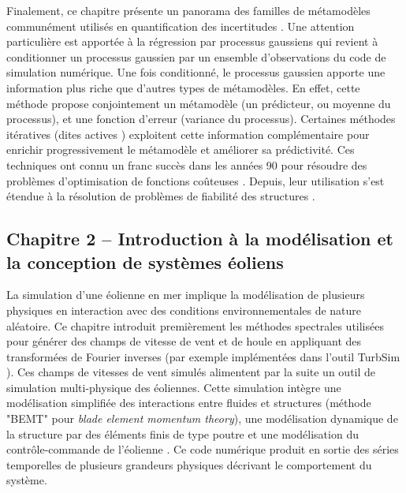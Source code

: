 Finalement, ce chapitre pr\'{e}sente un panorama des familles de m\'{e}tamodèles commun\'{e}ment utilis\'{e}s en quantification des incertitudes \citep{forrester_2008}. 
Une attention particulière est apport\'{e}e à la r\'{e}gression par processus gaussiens qui revient à conditionner un processus gaussien par un ensemble d'observations du code de simulation num\'{e}rique. 
Une fois conditionn\'{e}, le processus gaussien apporte une information plus riche que d'autres types de m\'{e}tamodèles. 
En effet, cette m\'{e}thode propose conjointement un m\'{e}tamodèle (un pr\'{e}dicteur, ou moyenne du processus), et une fonction d'erreur (variance du processus). 
Certaines m\'{e}thodes it\'{e}ratives (dites \og actives \fg{}) exploitent cette information compl\'{e}mentaire pour enrichir progressivement le m\'{e}tamodèle et am\'{e}liorer sa pr\'{e}dictivit\'{e}. 
Ces techniques ont connu un franc succès dans les ann\'{e}es 90 pour r\'{e}soudre des problèmes d'optimisation de fonctions coûteuses \citep{jones_1998}. 
Depuis, leur utilisation s'est \'{e}tendue à la r\'{e}solution de problèmes de fiabilit\'{e} des structures \citep{echard_2011}.

\subsection*{Chapitre 2 -- Introduction à la mod\'{e}lisation et la conception de systèmes \'{e}oliens}

La simulation d'une \'{e}olienne en mer implique la mod\'{e}lisation de plusieurs physiques en interaction avec des conditions environnementales de nature al\'{e}atoire. 
Ce chapitre introduit premièrement les m\'{e}thodes spectrales utilis\'{e}es pour g\'{e}n\'{e}rer des champs de vitesse de vent et de houle en appliquant des transform\'{e}es de Fourier inverses (par exemple impl\'{e}ment\'{e}es dans l'outil TurbSim \citealp{turbsim_2009}). 
Ces champs de vitesses de vent simul\'{e}s alimentent par la suite un outil de simulation multi-physique des \'{e}oliennes. 
Cette simulation intègre une mod\'{e}lisation simplifi\'{e}e des interactions entre fluides et structures (m\'{e}thode "BEMT" pour \textit{blade element momentum theory}), une mod\'{e}lisation dynamique de la structure par des \'{e}l\'{e}ments finis de type poutre et une mod\'{e}lisation du contrôle-commande de l'\'{e}olienne \citep{milano_thesis_2021}. 
Ce code num\'{e}rique produit en sortie des s\'{e}ries temporelles de plusieurs grandeurs physiques d\'{e}crivant le comportement du système.

